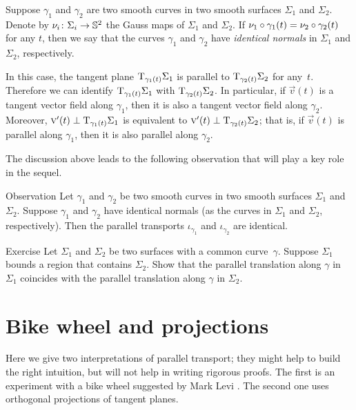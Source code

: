 Suppose $\gamma_1$ and $\gamma_2$ are two smooth curves in two smooth surfaces $\Sigma_1$ and $\Sigma_2$.
Denote by $\nu_i\colon\Sigma_i\to\mathbb{S}^2$ the Gauss maps of $\Sigma_1$ and $\Sigma_2$.
If $\nu_1\circ\gamma_1(t)= \nu_2\circ\gamma_2(t)$ for any $t$, then we say that the curves $\gamma_1$ and $\gamma_2$ have {}\emph{identical normals} in $\Sigma_1$ and $\Sigma_2$, respectively.

In this case, the tangent plane $\mathrm{T}_{\gamma_1(t)}\Sigma_1$ is parallel to $\mathrm{T}_{\gamma_2(t)}\Sigma_2$ for any~$t$.
Therefore we can identify $\mathrm{T}_{\gamma_1(t)}\Sigma_1$ with $\mathrm{T}_{\gamma_2(t)}\Sigma_2$.
In particular, if $\vec v(t)$ is a tangent vector field along $\gamma_1$,
then it is also a tangent vector field along $\gamma_2$.
Moreover, $\text{\sc{v}}'(t)\perp \mathrm{T}_{\gamma_1(t)}\Sigma_1$ is equivalent to $\text{\sc{v}}'(t)\perp \mathrm{T}_{\gamma_2(t)}\Sigma_2$; that is, if $\vec v(t)$ is parallel along $\gamma_1$,
then it is also parallel along $\gamma_2$.

The discussion above leads to the following observation that will play a key role in the sequel.

\begin{thm}{Observation}\label{obs:parallel=}
Let $\gamma_1$ and $\gamma_2$ be two smooth curves in two smooth surfaces $\Sigma_1$ and $\Sigma_2$.
Suppose $\gamma_1$ and $\gamma_2$ have identical normals (as the curves in $\Sigma_1$ and $\Sigma_2$, respectively).
Then the parallel transports $\iota_{\gamma_1}$ and $\iota_{\gamma_2}$ are identical. 
\end{thm}

\begin{thm}{Exercise}\label{ex:parallel-transport-support}
Let $\Sigma_1$ and $\Sigma_2$ be two surfaces with a common curve~$\gamma$.
Suppose $\Sigma_1$ bounds a region that contains $\Sigma_2$.
Show that the parallel translation along $\gamma$ in $\Sigma_1$ 
coincides with the parallel translation along $\gamma$ in $\Sigma_2$. 
\end{thm}

\section{Bike wheel and projections}

Here we give two interpretations of parallel transport;
they might help to build the right intuition, but will not help in writing rigorous proofs.
The first is an experiment with a bike wheel suggested by Mark Levi \cite{levi}.
The second one uses orthogonal projections of tangent planes.

